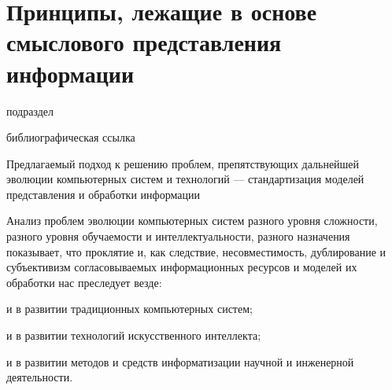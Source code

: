 \section{Принципы, лежащие в основе смыслового представления информации}
\label{sec_ngics_sense_principles}

\begin{scnrelfromlist}{подраздел}
\end{scnrelfromlist}

\begin{scnrelfromlist}{библиографическая ссылка}
\end{scnrelfromlist}

Предлагаемый подход к решению проблем, препятствующих дальнейшей эволюции компьютерных систем и технологий --- стандартизация моделей представления и обработки информации

Анализ проблем эволюции компьютерных систем разного уровня сложности, разного уровня обучаемости и интеллектуальности, разного назначения показывает, что проклятие  и, как следствие, несовместимость, дублирование и субъективизм согласовываемых информационных ресурсов и моделей их обработки нас преследует везде:
\begin{textitemize}
	\item и в развитии традиционных компьютерных систем;
	\item и в развитии технологий искусственного интеллекта;
	\item и в развитии методов и средств информатизации научной и инженерной деятельности.
\end{textitemize}

